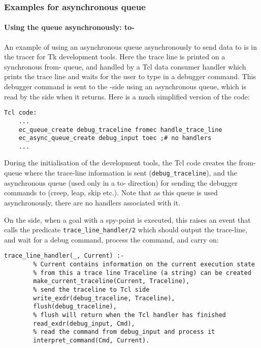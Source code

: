 \subsubsection{Examples for asynchronous queue}

\paragraph{Using the queue asynchronously: to-{\eclipse}}

An example of using an asynchronous queue asynchronously to send data to
{\eclipse} is in the tracer for Tk{\eclipse} development tools. Here the trace line is
printed on a synchronous from-{\eclipse} queue, and handled by a Tcl data
consumer handler which prints the trace line and waits for the user to type
in a debugger command. This debugger command is sent to the {\eclipse}-side
using an asynchronous queue, which is read by the {\eclipse} side when it
returns. Here is a much simplified version of the code:

\begin{verbatim}
Tcl code:
    ...
    ec_queue_create debug_traceline fromec handle_trace_line
    ec_async_queue_create debug_input toec ;# no handlers
    ...
\end{verbatim}

During the initialisation of the development tools, the Tcl code creates
the from-{\eclipse} queue where the trace-line information is sent
(\verb'debug_traceline'), and the asynchronous queue (used only in a
to-{\eclipse} direction) for sending the debugger commands to {\eclipse}
(creep, leap, skip etc.). Note that as this queue is used asynchronously,
there are no handlers associated with it.

On the {\eclipse} side, when a goal with a spy-point is executed, this
raises an event that calls the predicate \verb'trace_line_handler/2' which 
should output the trace-line, and wait for a debug command, process the
command, and carry on:

\begin{verbatim}
trace_line_handler(_, Current) :-
        % Current contains information on the current execution state
        % from this a trace line Traceline (a string) can be created
        make_current_traceline(Current, Traceline),
        % send the traceline to Tcl side
        write_exdr(debug_traceline, Traceline),
        flush(debug_traceline),	
        % flush will return when the Tcl handler has finished
        read_exdr(debug_input, Cmd),
        % read the command from debug_input and process it
        interpret_command(Cmd, Current).
\end{verbatim}

